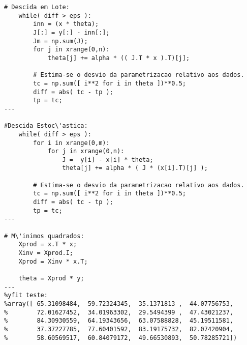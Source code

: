 \documentclass[a4paper,12pt]{article}
\begin{document}
\begin{verbatim}
# Descida em Lote:
    while( diff > eps ):
        inn = (x * theta);
        J[:] = y[:] - inn[:];
        Jm = np.sum(J);
        for j in xrange(0,n):
            theta[j] += alpha * (( J.T * x ).T)[j];
    
        # Estima-se o desvio da parametrizacao relativo aos dados.
        tc = np.sum([ i**2 for i in theta ])**0.5;
        diff = abs( tc - tp );
        tp = tc;
---
    
#Descida Estoc\'astica:
    while( diff > eps ):
        for i in xrange(0,m):
            for j in xrange(0,n):
                J =  y[i] - x[i] * theta;
                theta[j] += alpha * ( J * (x[i].T)[j] );

        # Estima-se o desvio da parametrizacao relativo aos dados.
        tc = np.sum([ i**2 for i in theta ])**0.5;
        diff = abs( tc - tp );
        tp = tc;
---
    
# M\'inimos quadrados:
    Xprod = x.T * x;
    Xinv = Xprod.I;
    Xprod = Xinv * x.T;

    theta = Xprod * y;
---
%yfit teste:    
%array([ 65.31098484,  59.72324345,  35.1371813 ,  44.07756753,
%        72.01627452,  34.01963302,  29.5494399 ,  47.43021237,
%        84.30930559,  64.19343656,  63.07588828,  45.19511581,
%        37.37227785,  77.60401592,  83.19175732,  82.07420904,
%        58.60569517,  60.84079172,  49.66530893,  50.78285721])

\end{verbatim}
\end{document}
